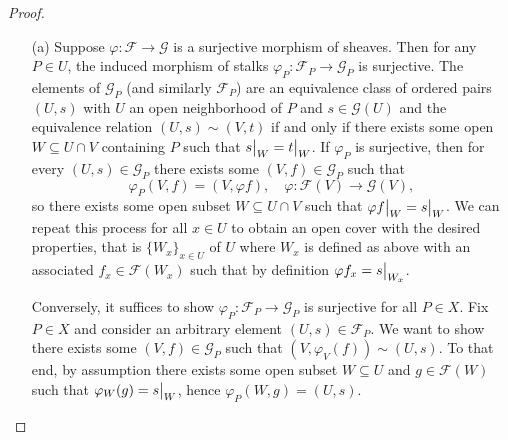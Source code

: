 \documentclass{article}
\newcommand{\fF}{\mathscr{F}}
\newcommand{\fG}{\mathscr{G}}
\newcommand\restr[2]{{%
  \left.\kern-\nulldelimiterspace %
  #1 %
  \vphantom{\big|} %
  \right|_{#2} %
}}
\begin{document}
\begin{enumerate} [label=\textbf{\arabic*.}, leftmargin=0em]
\begin{proof} $ $ \vspace{0pt}
    \begin{itemize} [leftmargin=0cm]
        \item[(a)] Suppose $\varphi : \fF \to \fG$ is a surjective morphism of sheaves. Then for any $P \in U$, the induced morphism of stalks $\varphi_P : \fF_P \to \fG_P$ is surjective. The elements of $\fG_P$ (and similarly $\fF_P$) are an equivalence class of ordered pairs $(U, s)$ with $U$ an open neighborhood of $P$ and $s \in \fG(U)$ and the equivalence relation $(U, s) \sim (V, t)$ if and only if there exists some open $W \subseteq U \cap V$ containing $P$ such that $\restr{s}{W} = \restr{t}{W}$. If $\varphi_P$ is surjective, then for every $(U, s) \in \fG_P$ there exists some $(V, f) \in \fG_P$ such that
        \begin{equation*}
            \varphi_P(V, f) = (V, \varphi  f), \quad \varphi : \fF(V) \to \fG(V),
        \end{equation*}
        so there exists some open subset $W \subseteq U \cap V$ such that $\restr{\varphi f}{W} = \restr{s}{W}$. We can repeat this process for all $x \in U$ to obtain an open cover with the desired properties, that is $\{ W_x \}_{x \in U}$ of $U$ where $W_x$ is defined as above with an associated $f_x \in \fF(W_x)$ such that by definition $\varphi f_x = \restr{s}{W_x}$.

        Conversely, it suffices to show $\varphi_P : \fF_P \to \fG_P$ is surjective for all $P \in X$. Fix $P \in X$ and consider an arbitrary element $(U, s) \in \fF_P$. We want to show there exists some $(V, f) \in \fG_P$ such that $(V, \varphi_V(f)) \sim (U, s)$. To that end, by assumption there exists some open subset $W \subseteq U$ and $g \in \fF(W)$ such that $\varphi_W(g) = \restr{s}{W}$, hence $\varphi_P(W, g) = (U, s)$.


\end{itemize}
\end{proof}
\end{enumerate}
\end{document}
